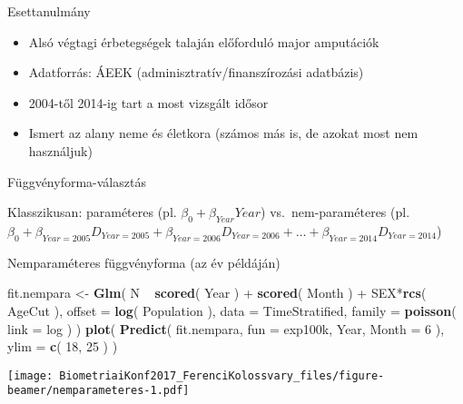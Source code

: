\documentclass[ignorenonframetext,]{beamer}
\newenvironment{Shaded}{\begin{snugshade}}{\end{snugshade}}
\newcommand{\KeywordTok}[1]{\textcolor[rgb]{0.13,0.29,0.53}{\textbf{{#1}}}}
\newcommand{\DataTypeTok}[1]{\textcolor[rgb]{0.13,0.29,0.53}{{#1}}}
\newcommand{\DecValTok}[1]{\textcolor[rgb]{0.00,0.00,0.81}{{#1}}}
\newcommand{\StringTok}[1]{\textcolor[rgb]{0.31,0.60,0.02}{{#1}}}
\newcommand{\NormalTok}[1]{{#1}}
\providecommand{\tightlist}{%
\setlength{\itemsep}{0pt}\setlength{\parskip}{0pt}}
\begin{document}
\begin{frame}{Esettanulmány}

\begin{itemize}
\tightlist
\item
  Alsó végtagi érbetegségek talaján előforduló major amputációk
\item
  Adatforrás: ÁEEK (adminisztratív/finanszírozási adatbázis)
\item
  2004-től 2014-ig tart a most vizsgált idősor
\item
  Ismert az alany neme és életkora (számos más is, de azokat most nem
  használjuk)
\end{itemize}

\end{frame}

\begin{frame}{Függvényforma-választás}

Klasszikusan: paraméteres (pl. \(\beta_0+\beta_{Year} Year\))
vs.~nem-paraméteres (pl.
\(\beta_0+\beta_{Year=2005}D_{Year=2005}+\beta_{Year=2006}D_{Year=2006}+\ldots+\beta_{Year=2014}D_{Year=2014}\))

\end{frame}

\begin{frame}[fragile]{Nemparaméteres függvényforma (az év példáján)}

\begin{Shaded}
\begin{Highlighting}[]
\NormalTok{fit.nempara <-}\StringTok{ }\KeywordTok{Glm}\NormalTok{( N ~}\StringTok{ }\KeywordTok{scored}\NormalTok{( Year ) +}\StringTok{ }\KeywordTok{scored}\NormalTok{( Month ) +}\StringTok{ }\NormalTok{SEX*}\KeywordTok{rcs}\NormalTok{( AgeCut ),}
                    \DataTypeTok{offset =} \KeywordTok{log}\NormalTok{( Population ), }\DataTypeTok{data =} \NormalTok{TimeStratified,}
                    \DataTypeTok{family =} \KeywordTok{poisson}\NormalTok{( }\DataTypeTok{link =} \NormalTok{log ) )}
\KeywordTok{plot}\NormalTok{( }\KeywordTok{Predict}\NormalTok{( fit.nempara, }\DataTypeTok{fun =} \NormalTok{exp100k, Year, }\DataTypeTok{Month =} \DecValTok{6} \NormalTok{), }\DataTypeTok{ylim =} \KeywordTok{c}\NormalTok{( }\DecValTok{18}\NormalTok{, }\DecValTok{25} \NormalTok{) )}
\end{Highlighting}
\end{Shaded}

\texttt{[image: BiometriaiKonf2017\_FerenciKolossvary\_files/figure-beamer/nemparameteres-1.pdf]}

\end{frame}
\end{document}
